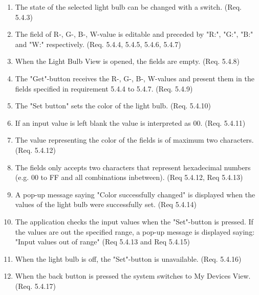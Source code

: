 \documentclass[a4paper]{article}
\newlength{\testlabellength}
\newenvironment{testlist}{\begin{enumerate}[label=\bfseries Test \thesubsection.\arabic* , labelindent=0pt, labelwidth=\testlabellength , leftmargin=2cm]}{\end{enumerate}}
\begin{document}
\begin{appendices}
\begin{testlist}
    \item The state of the selected light bulb can be changed with a switch. (Req. 5.4.3)
    
    \item The field of R-, G-, B-, W-value is editable and preceded by "R:", "G:", "B:" and "W:" respectively. (Req. 5.4.4, 5.4.5, 5.4.6, 5.4.7) 

    
	\item When the Light Bulb View is opened, the fields are empty. (Req. 5.4.8)

	\item The "Get"-button receives the R-, G-, B-, W-values and present them in the fields specified in requirement 5.4.4 to 5.4.7. (Req. 5.4.9)

	\item The "Set button" sets the color of the light bulb.	(Req. 5.4.10)

	\item If an input value is left blank the value is interpreted as 00. (Req. 5.4.11)    
    
    
    \item The value representing the color of the fields is of maximum two characters. (Req. 5.4.12)
    
    \item The fields only accepts two characters that represent hexadecimal numbers (e.g. 00 to FF and all combinations inbetween). (Req 5.4.12, Req 5.4.13)
    
    \item A pop-up message saying "Color successfully changed" is displayed when the values of the light bulb were successfully set. (Req 5.4.14)
    
    \item The application checks the input values when the "Set"-button is pressed. If the values are out the specified range, a pop-up message is displayed saying: "Input values out of range" (Req 5.4.13 and Req 5.4.15)
    
    \item When the light bulb is off, the "Set"-button is unavailable. (Req. 5.4.16)
    
    \item When the back button is pressed the system switches to My Devices View. (Req. 5.4.17)

\end{testlist}	

\newpage


\end{appendices}
\end{document}
